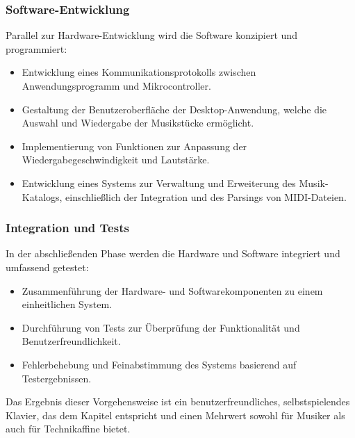 \subsubsection{Software-Entwicklung}\label{Vorgehensweise - Software-Entwicklung}

Parallel zur Hardware-Entwicklung wird die Software konzipiert und programmiert:

\begin{itemize}
    \item Entwicklung eines Kommunikationsprotokolls zwischen Anwendungsprogramm und Mikrocontroller.
    \item Gestaltung der Benutzeroberfläche der Desktop-Anwendung, welche die Auswahl und Wiedergabe der Musikstücke ermöglicht.
    \item Implementierung von Funktionen zur Anpassung der Wiedergabegeschwindigkeit und Lautstärke.
    \item Entwicklung eines Systems zur Verwaltung und Erweiterung des Musik-Katalogs, einschließlich der Integration und des Parsings von MIDI-Dateien.
\end{itemize}

\subsubsection{Integration und Tests}\label{Vorgehensweise - Integration und Tests}

In der abschließenden Phase werden die Hardware und Software integriert und umfassend getestet:

\begin{itemize}
    \item Zusammenführung der Hardware- und Softwarekomponenten zu einem einheitlichen System.
    \item Durchführung von Tests zur Überprüfung der Funktionalität und Benutzerfreundlichkeit.
    \item Fehlerbehebung und Feinabstimmung des Systems basierend auf Testergebnissen.
\end{itemize}

Das Ergebnis dieser Vorgehensweise ist ein benutzerfreundliches, selbstspielendes Klavier,
das dem Kapitel  entspricht und einen Mehrwert sowohl für Musiker als auch für Technikaffine bietet.
